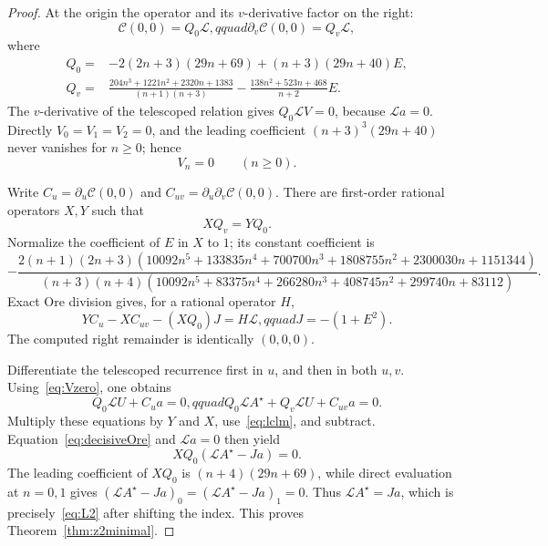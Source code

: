 \documentclass[11pt,reqno]{amsart}
\theoremstyle{definition}
\theoremstyle{remark}
\begin{document}
\begin{proof}
At the origin the operator and its $v$-derivative factor on the right:
\begin{equation}\label{eq:paramFactors}
 \mathcal C(0,0)=Q_0\mathcal L,qquad
 \partial_v\mathcal C(0,0)=Q_v\mathcal L,
\end{equation}
where
\begin{align}\label{eq:Q0Qv}
 Q_0={}&-2(2n+3)(29n+69)+(n+3)(29n+40)E,\\
 Q_v={}&\frac{204n^3+1221n^2+2320n+1383}{(n+1)(n+3)}
 -\frac{138n^2+523n+468}{n+2}E.
\end{align}
The $v$-derivative of the telescoped relation gives $Q_0\mathcal LV=0$,
because $\mathcal La=0$.  Directly $V_0=V_1=V_2=0$, and the leading
coefficient $(n+3)^3(29n+40)$ never vanishes for $n\geq0$; hence
\begin{equation}\label{eq:Vzero}
 V_n=0\qquad(n\geq0).
\end{equation}

Write $C_u=\partial_u\mathcal C(0,0)$ and
$C_{uv}=\partial_u\partial_v\mathcal C(0,0)$.  There are first-order rational
operators $X,Y$ such that
\begin{equation}\label{eq:lclm}
 XQ_v=YQ_0.
\end{equation}
Normalize the coefficient of $E$ in $X$ to $1$; its constant coefficient is
\begin{equation}\label{eq:Xconstant}
 -\frac{2(n+1)(2n+3)
 (10092n^5+133835n^4+700700n^3+1808755n^2+2300030n+1151344)}
 {(n+3)(n+4)
 (10092n^5+83375n^4+266280n^3+408745n^2+299740n+83112)}.
\end{equation}
Exact Ore division gives, for a rational operator $H$,
\begin{equation}\label{eq:decisiveOre}
 YC_u-XC_{uv}-(XQ_0)J=H\mathcal L,qquad J=-(1+E^2).
\end{equation}
The computed right remainder is identically $(0,0,0)$.

Differentiate the telescoped recurrence first in $u$, and then in both $u,v$.
Using~\eqref{eq:Vzero}, one obtains
\[
 Q_0\mathcal LU+C_ua=0,qquad
 Q_0\mathcal LA^\star+Q_v\mathcal LU+C_{uv}a=0.
\]
Multiply these equations by $Y$ and $X$, use~\eqref{eq:lclm}, and subtract.
Equation~\eqref{eq:decisiveOre} and $\mathcal La=0$ then yield
\[
 XQ_0(\mathcal LA^\star-Ja)=0.
\]
The leading coefficient of $XQ_0$ is $(n+4)(29n+69)$, while direct evaluation
at $n=0,1$ gives
$(\mathcal LA^\star-Ja)_0=(\mathcal LA^\star-Ja)_1=0$.  Thus
$\mathcal LA^\star=Ja$, which is precisely~\eqref{eq:L2} after shifting the
index.  This proves Theorem~\ref{thm:z2minimal}.
\end{proof}
\end{document}
